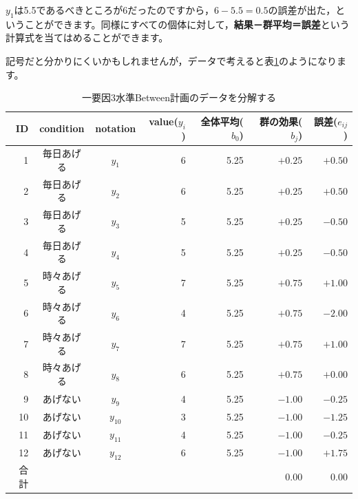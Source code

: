 \documentclass{ltjbook}
\begin{document}
$y_{1}$は5.5であるべきところが6だったのですから，$6-5.5=0.5$の誤差が出た，ということができます。同様にすべての個体に対して，\textbf{結果－群平均＝誤差}という計算式を当てはめることができます。

記号だと分かりにくいかもしれませんが，データで考えると表\ref{tbl:18_02}のようになります。
\begin{table}[ht]
	\centering
	\caption{一要因3水準Between計画のデータを分解する}
	\begin{tabular}{rccrrrr}
		\hline
		ID & condition & notation & value($y_{i}$) & 全体平均($b_0$) & 群の効果($b_j$) & 誤差($e_{ij}$) \\
		\hline
		1  & 毎日あげる     & $y_{1}$  & 6              & 5.25        & $+0.25$     & $+0.50$      \\
		2  & 毎日あげる     & $y_{2}$  & 6              & 5.25        & $+0.25$     & $+0.50$      \\
		3  & 毎日あげる     & $y_{3}$  & 5              & 5.25        & $+0.25$     & $-0.50$      \\
		4  & 毎日あげる     & $y_{4}$  & 5              & 5.25        & $+0.25$     & $-0.50$      \\
		5  & 時々あげる     & $y_{5}$  & 7              & 5.25        & $+0.75$     & $+1.00$      \\
		6  & 時々あげる     & $y_{6}$  & 4              & 5.25        & $+0.75$     & $-2.00$      \\
		7  & 時々あげる     & $y_{7}$  & 7              & 5.25        & $+0.75$     & $+1.00$      \\
		8  & 時々あげる     & $y_{8}$  & 6              & 5.25        & $+0.75$     & $+0.00$      \\
		9  & あげない      & $y_{9}$  & 4              & 5.25        & $-1.00$     & $-0.25$      \\
		10 & あげない      & $y_{10}$ & 3              & 5.25        & $-1.00$     & $-1.25$      \\
		11 & あげない      & $y_{11}$ & 4              & 5.25        & $-1.00$     & $-0.25$      \\
		12 & あげない      & $y_{12}$ & 6              & 5.25        & $-1.00$     & $+1.75$      \\
		\hline\hline
		合計 &           &          &                &             & 0.00        & 0.00         \\\hline
	\end{tabular}
	\label{tbl:18_02}
\end{table}
\end{document}
